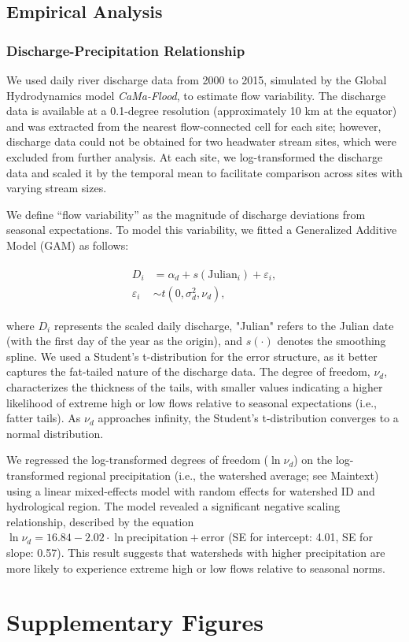 \documentclass[11pt, class=article, crop=false]{standalone}
\begin{document}
\newpage

\subsection{Empirical Analysis}

\subsubsection{Discharge-Precipitation Relationship}
We used daily river discharge data from 2000 to 2015, simulated by the Global Hydrodynamics model \textit{CaMa-Flood}, to estimate flow variability.
The discharge data is available at a 0.1-degree resolution (approximately 10 km at the equator) and was extracted from the nearest flow-connected cell for each site; however, discharge data could not be obtained for two headwater stream sites, which were excluded from further analysis.
At each site, we log-transformed the discharge data and scaled it by the temporal mean to facilitate comparison across sites with varying stream sizes.

We define ``flow variability'' as the magnitude of discharge deviations from seasonal expectations.
To model this variability, we fitted a Generalized Additive Model (GAM) as follows:

\begin{align}
    \begin{split}
    D_i &= \alpha_d + s(\text{Julian}_i) + \varepsilon_i,\\
    \varepsilon_i &\sim t(0, \sigma_d^2, \nu_d),
    \end{split}
\end{align}

where $D_i$ represents the scaled daily discharge, "Julian" refers to the Julian date (with the first day of the year as the origin), and $s(\cdot)$ denotes the smoothing spline.
We used a Student's t-distribution for the error structure, as it better captures the fat-tailed nature of the discharge data.
The degree of freedom, $\nu_d$, characterizes the thickness of the tails, with smaller values indicating a higher likelihood of extreme high or low flows relative to seasonal expectations (i.e., fatter tails).
As $\nu_d$ approaches infinity, the Student's t-distribution converges to a normal distribution.

We regressed the log-transformed degrees of freedom ($\ln \nu_d$) on the log-transformed regional precipitation (i.e., the watershed average; see Maintext) using a linear mixed-effects model with random effects for watershed ID and hydrological region.
The model revealed a significant negative scaling relationship, described by the equation $\ln \nu_d = 16.84 - 2.02 \cdot \ln \text{precipitation} + \text{error}$ (SE for intercept: 4.01, SE for slope: 0.57).
This result suggests that watersheds with higher precipitation are more likely to experience extreme high or low flows relative to seasonal norms.

\newpage

\section{Supplementary Figures}


\end{document}
